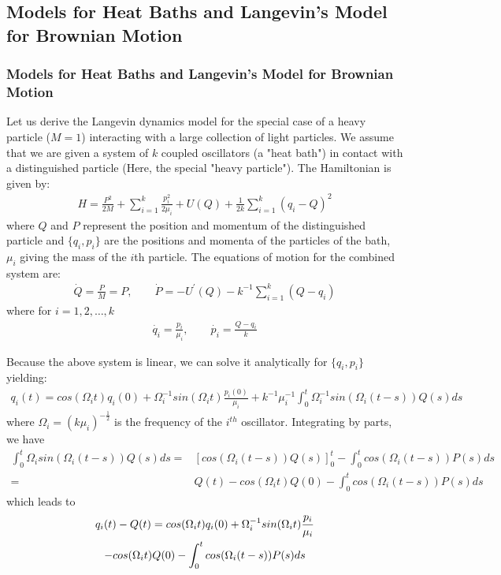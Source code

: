 \documentclass[a4paper,8pt]{beamer}
\begin{document}
	\begin{frame}
		\section{Models for Heat Baths and Langevin's Model for Brownian Motion}
		\frametitle{Models for Heat Baths and Langevin's Model for Brownian Motion}
		Let us derive the Langevin dynamics model for the special case of a heavy particle ($M = 1$) interacting with a large collection of light particles. We assume that we are given a system of $k$ coupled oscillators (a "heat bath") in contact with a distinguished particle (Here, the special "heavy particle"). The Hamiltonian is given by:
		\begin{gather}
			H = \frac{P^2}{2M} + \sum_{i=1}^{k} \frac{p_{i}^2}{2 \mu_{i}} + U(Q) + \frac{1}{2k} \sum_{i=1}^{k} (q_{i} - Q)^2
		\end{gather}
		where $Q$ and $P$ represent the position and momentum of the distinguished particle and $\{q_{i},p_{i}\}$ are the positions and momenta of the particles of the bath, $\mu_{i}$ giving the mass of the $i$th particle.
		The equations of motion for the combined system are:
		\begin{gather}
			\dot{Q} = \frac{P}{M} = P, \quad \quad
			\dot{P} = -U^{'}(Q) - k^{-1} \sum_{i=1}^{k} (Q-q_{i})
			\label{eq:BigQP}
		\end{gather}
		where for $i = 1,2,\dots,k$
		\begin{gather}
			\dot{q_{i}} = \frac{p_{i}}{\mu_{i}}, \quad \quad
			\dot{p_{i}} = \frac{Q-q_{i}}{k}
			\label{eq:SmallQP}
		\end{gather}
	\end{frame}

	\begin{frame}
		Because the above system is linear, we can solve it analytically for $\{q_{i},p_{i}\}$ yielding:
		\begin{gather}
			q_{i}(t) = cos(\Omega_{i}t)q_{i}(0) + \Omega_{i}^{-1} sin(\Omega_{i}t)\frac{p_{i}(0)}{\mu_{i}} +  k^{-1}\mu_{i}^{-1} \int_{0}^{t} {\Omega_{i}^{-1} sin(\Omega_{i}(t-s))Q(s)ds}
		\end{gather}
		where $\Omega_{i} = (k \mu_{i})^{-\frac{1}{2}}$ is the frequency of the $i^{th}$ oscillator. Integrating by parts, we have
		\begin{align}
			\int_{0}^{t} \Omega_{i} sin(\Omega_{i}(t-s))Q(s)ds =& [cos(\Omega_{i}(t-s))Q(s)]_{0}^{t}
			- \int_{0}^{t} cos(\Omega_{i} (t-s))P(s)ds \\
			=& Q(t) - cos(\Omega_{i} t)Q(0) - \int_{0}^{t} cos(\Omega_{i}(t-s))P(s)ds
		\end{align}
		which leads to
		\begin{gather}
			\notag q_{i}(t) - Q(t) = cos(\Omega_{i}t)q_{i}(0) + \Omega_{i}^{-1} sin(\Omega_{i}t)\frac{p_{i}}{\mu_{i}} \\ - cos(\Omega_{i}t)Q(0) - \int_{0}^{t} cos(\Omega_{i}(t-s))P(s)ds
		\end{gather}
	\end{frame}
\end{document}
